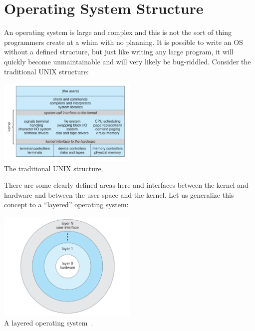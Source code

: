 




\section*{Operating System Structure}

An operating system is large and complex and this is not the sort of thing programmers create at a whim with no planning. It is possible to write an OS without a defined structure, but just like writing any large program, it will quickly become unmaintainable and will very likely be bug-riddled. Consider the traditional UNIX structure:

\begin{center}
\includegraphics[width=0.5\textwidth]{images/unix-structure.png}\\
The traditional UNIX structure\cite{osc}.
\end{center}

There are some clearly defined areas here and interfaces between the kernel and hardware and between the user space and the kernel. Let us generalize this concept to a ``layered'' operating system: 

\begin{center}
\includegraphics[width=0.5\textwidth]{images/layered-os.png}\\
A layered operating system~\cite{osc}.
\end{center}

